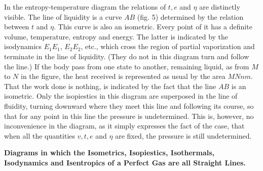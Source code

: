 \documentclass[11pt]{article}
\newcommand{\figlabel}[1]{\par\smallskip\centerline{\small #1}\smallskip}
\begin{document}
In the entropy-temperature diagram the relations of $t,e$ and $\eta$ are distinctly visible. The line of liquidity is a curve $AB$ (fig. 5) determined by the relation between $t$ and $\eta$. This curve is also an isometric. Every point of it has a definite volume, temperature, entropy and energy. The latter is indicated by the isodynamics $E_1E_1$, $E_2E_2$, etc., which cross the region of partial vaporization and terminate in the line of liquidity. (They do not in this diagram turn and follow the line.) If the body pass from one state to another, remaining liquid, as from $M$ to $N$ in the figure, the heat received is represented as usual by the area $MNnm$. That the work done is nothing, is indicated by the fact that the line $AB$ is an isometric. Only the isopiestics in this diagram are superposed in the line of fluidity, turning downward where they meet this line and following its course, so that for any point in this line the pressure is undetermined. This is, however, no inconvenience in the diagram, as it simply expresses the fact of the case, that when all the quantities $v,t,e$ and $\eta$ are fixed, the pressure is still undetermined.


\begin{center}
\end{center}


\begin{center}
\bfseries Diagrams in which the Isometrics, Isopiestics, Isothermals, Isodynamics and Isentropics of a Perfect Gas are all Straight Lines.
\end{center}
\end{document}
